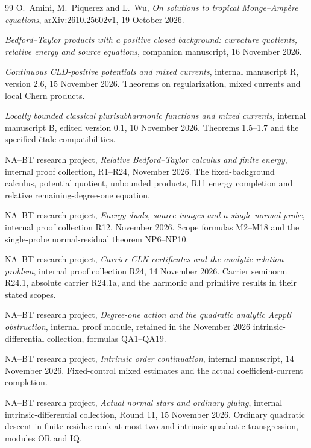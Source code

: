 \documentclass[11pt,a4paper]{article}
\theoremstyle{definition}
\theoremstyle{remark}
\numberwithin{equation}{section}
\begin{document}
\begin{thebibliography}{99}
O.~Amini, M.~Piquerez and L.~Wu,
\emph{On solutions to tropical Monge--Amp\`ere equations},
\href{https://arxiv.org/abs/2610.25602v1}{arXiv:2610.25602v1},
19 October 2026.

\emph{Bedford--Taylor products with a positive closed
background: curvature quotients, relative energy and source equations},
companion manuscript, 16 November 2026.

\emph{Continuous CLD-positive potentials and mixed currents},
internal manuscript R, version 2.6, 15 November 2026.  Theorems on
regularization, mixed currents and local Chern products.

\emph{Locally bounded classical plurisubharmonic functions and mixed currents}, internal manuscript B, edited version 0.1,
10 November 2026.  Theorems 1.5--1.7 and the specified \`etale
compatibilities.

NA--BT research project, \emph{Relative Bedford--Taylor calculus and finite energy},
internal proof collection, R1--R24, November 2026.  The fixed-background
calculus, potential quotient, unbounded products, R11 energy completion
and relative remaining-degree-one equation.

NA--BT research project, \emph{Energy duals, source images and a single normal probe},
internal proof collection R12, November 2026.  Scope formulas
M2--M18 and the single-probe normal-residual theorem NP6--NP10.

NA--BT research project, \emph{Carrier-CLN certificates and the analytic relation
problem}, internal proof collection R24, 14 November 2026.  Carrier
seminorm R24.1, absolute carrier R24.1a, and the harmonic and
primitive results in their stated scopes.

NA--BT research project, \emph{Degree-one action and the quadratic analytic Aeppli
obstruction}, internal proof module, retained in the November 2026
intrinsic-differential collection, formulas QA1--QA19.

NA--BT research project, \emph{Intrinsic order continuation}, internal manuscript,
14 November 2026.  Fixed-control mixed estimates and the actual
coefficient-current completion.

NA--BT research project, \emph{Actual normal stars and ordinary
gluing}, internal intrinsic-differential collection,
Round 11, 15 November 2026.  Ordinary quadratic descent in finite
residue rank at most two and intrinsic quadratic transgression,
modules OR and IQ.


\end{thebibliography}
\end{document}
